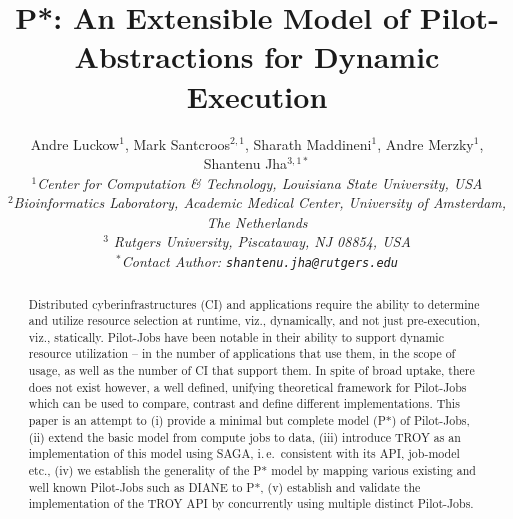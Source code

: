 \documentclass[conference,final]{IEEEtran}
\title{P*: An Extensible Model of Pilot-Abstractions for Dynamic Execution}
\date{}
\newcommand{\up}{\vspace*{-1em}}
\newcommand{\upp}{\vspace*{-0.5em}}
\begin{document}
\ifpdf
{}
\else
{}
\fi

\author{
  Andre Luckow$^{1}$, Mark Santcroos$^{2,1}$, Sharath Maddineni$^{1}$, Andre Merzky$^{1}$, Shantenu Jha$^{3,1*}$\\
  \small{\emph{$^{1}$Center for Computation \& Technology, Louisiana State University, USA}}\\
 \small{\emph{$^{2}$Bioinformatics Laboratory, Academic Medical Center, University of Amsterdam, The Netherlands}}\\
 \small{\emph{$^{3}$ Rutgers University, Piscataway, NJ 08854, USA}}\\
  \small{\emph{$^{*}$Contact Author: \texttt{shantenu.jha@rutgers.edu}}}\\
  \up\up\up\up }

\maketitle

\begin{abstract}
  Distributed cyberinfrastructures (CI) and applications require the
  ability to determine and utilize resource selection at runtime,
  viz., dynamically, and not just pre-execution, viz., statically.
  Pilot-Jobs have been notable in their ability to support dynamic
  resource utilization -- in the number of applications that use them,
  in the scope of usage, as well as the number of CI that support
  them.  In spite of broad uptake, there does not exist however, a
  well defined, unifying theoretical framework for Pilot-Jobs which
  can be used to compare, contrast and define different
  implementations. This paper is an attempt to (i) provide a minimal
  but complete model (P*) of Pilot-Jobs, (ii) extend the basic model
  from compute jobs to data, (iii) introduce TROY as an implementation
  of this model using SAGA, i.\,e.\ consistent with its API, job-model
  etc., (iv) we establish the generality of the P* model by mapping
  various existing and well known Pilot-Jobs such as DIANE to P*, (v)
  establish and validate the implementation of the TROY API by
  concurrently using multiple distinct Pilot-Jobs.\upp\upp\upp\upp
\end{abstract}
\end{document}
